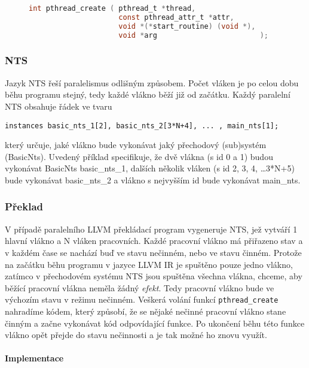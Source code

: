 \documentclass[10pt,a4paper,notitlepage]{report}
\begin{document}
\begin{figure}[h!]
\begin{lstlisting}[language=C]
int pthread_create ( pthread_t *thread,
                     const pthread_attr_t *attr,
                     void *(*start_routine) (void *),
                     void *arg                        );
\end{lstlisting}
\end{figure}

\subsubsection{NTS}
Jazyk NTS řeší paralelismus odlišným způsobem. Počet vláken je po celou dobu běhu programu stejný, tedy každé vlákno běží již od začátku. Každý paralelní NTS obsahuje řádek  ve tvaru
\begin{lstlisting}
instances basic_nts_1[2], basic_nts_2[3*N+4], ... , main_nts[1];
\end{lstlisting}
který určuje, jaké vlákno bude vykonávat jaký přechodový (sub)systém (BasicNts). Uvedený příklad specifikuje, že dvě vlákna (s id 0 a 1) budou vykonávat BasicNts basic\_nts\_1, dalších několik vláken (s id 2, 3, 4, \ldots 3*N+5) bude vykonávat basic\_nts\_2 a vlákno s nejvyšším id bude vykonávat main\_nts.

\subsubsection{Překlad}
V případě paralelního LLVM překládací program vygeneruje NTS, jež vytváří 1 hlavní vlákno a N vláken pracovních. Každé pracovní vlákno má přiřazeno stav a v každém čase se nachází buď ve stavu nečinném, nebo ve stavu činném. Protože na začátku běhu programu v jazyce LLVM IR je spuštěno pouze jedno vlákno, zatímco v přechodovém systému NTS jsou spuštěna všechna vlákna, chceme, aby běžící pracovní vlákna neměla žádný \textit{efekt}. Tedy pracovní vlákno bude ve výchozím stavu v režimu nečinném. Veškerá volání funkcí \texttt{pthread\_create} nahradíme kódem, který způsobí, že se nějaké nečinné pracovní vlákno stane činným a začne vykonávat kód odpovídající funkce. Po ukončení běhu této funkce vlákno opět přejde do stavu nečinnosti a je tak možné ho znovu využít.


\paragraph{Implementace}
\end{document}
